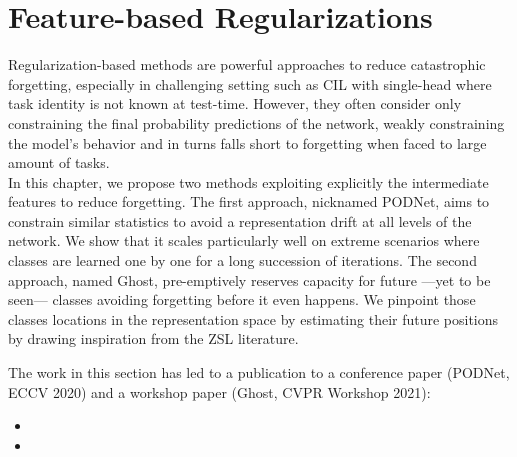 \chapter{Feature-based Regularizations}
\label{chapter:regularization}

\newcommand{\tableindent}{\,\,\,\,}
\newcommand{\vt}{\mathbf{t}}
\newcommand{\std}{$\pm\,$}
\newcommand{\clf}{\textit{clf}} \newcommand{\gray}[1]{{\color{darkgray}#1}}


\begin{chapabstract}
    Regularization-based methods are powerful approaches to reduce catastrophic forgetting,
    especially in challenging setting such as \ac{CIL} with single-head where task identity is not
    known at test-time. However, they often consider only constraining the final probability
    predictions of the network, weakly constraining the model's behavior and in turns falls short to
    forgetting when faced to large amount of tasks.
    \\
    In this chapter, we propose two methods exploiting explicitly the intermediate features to
    reduce forgetting. The first approach, nicknamed PODNet, aims to constrain similar statistics to
    avoid a representation drift at all levels of the network. We show that it scales particularly
    well on extreme scenarios where classes are learned one by one for a long succession of
    iterations. The second approach, named Ghost, pre-emptively reserves capacity for future ---yet
    to be seen--- classes avoiding forgetting before it even happens. We pinpoint those classes
    locations in the representation space by estimating their future positions by drawing
    inspiration from the \ac{ZSL} literature.

    The work in this section has led to a publication to a conference paper (PODNet, ECCV 2020) and
    a workshop paper (Ghost, CVPR Workshop 2021):

    \begin{itemize}
        \item {}
        \item {}
    \end{itemize}

\end{chapabstract}
\newpage

\minitoc
{}

